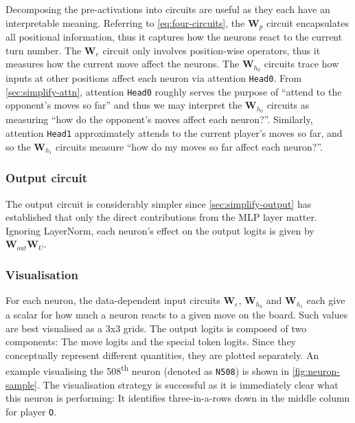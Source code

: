 \documentclass{article}
\newcommand{\m}[1]{\mathbf{\bm{#1}}}
\newcounter{num}
\begin{document}
Decomposing the pre-activations into circuits are useful as they each have an interpretable meaning. Referring to \cref{eq:four-circuits}, the $\m{W}_p$ circuit encapsulates all positional information, thus it captures how the neurons react to the current turn number. The $\m{W}_e$ circuit only involves position-wise operators, thus it measures how the current move affect the neurons. The $\m{W}_{h_0}$ circuits trace how inputs at other positions affect each neuron via attention \texttt{Head0}. From \cref{sec:simplify-attn}, attention \texttt{Head0} roughly serves the purpose of ``attend to the opponent's moves so far'' and thus we may interpret the $\m{W}_{h_0}$ circuits as measuring ``how do the opponent's moves affect each neuron?''. Similarly, attention \texttt{Head1} approximately attends to the current player's moves so far, and so the $\m{W}_{h_1}$ circuits measure ``how do my moves so far affect each neuron?''.

\subsubsection{Output circuit}

The output circuit is considerably simpler since \cref{sec:simplify-output} has established that only the direct contributions from the MLP layer matter. Ignoring LayerNorm, each neuron's effect on the output logits is given by $\m{W}_{out} \m{W}_U$.

\subsubsection{Visualisation}



For each neuron, the data-dependent input circuits $\m{W}_e$, $\m{W}_{h_0}$ and $\m{W}_{h_1}$ each give a scalar for how much a neuron reacts to a given move on the board. Such values are best visualised as a 3x3 grids. The output logits is composed of two components: The move logits and the special token logits. Since they conceptually represent different quantities, they are plotted separately. An example visualising the 508\textsuperscript{th} neuron (denoted as \texttt{N508}) is shown in \cref{fig:neuron-sample}. The visualisation strategy is successful as it is immediately clear what this neuron is performing: It identifies three-in-a-rows down in the middle column for player \texttt{O}.

\newpage


\end{document}
